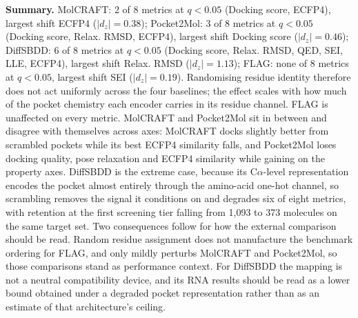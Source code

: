 \noindent\textbf{Summary.} 
MolCRAFT: 2 of 8 metrics at $q<0.05$ (Docking score, ECFP4), largest shift ECFP4 ($|d_z|=0.38$); Pocket2Mol: 3 of 8 metrics at $q<0.05$ (Docking score, Relax. RMSD, ECFP4), largest shift Docking score ($|d_z|=0.46$); DiffSBDD: 6 of 8 metrics at $q<0.05$ (Docking score, Relax. RMSD, QED, SEI, LLE, ECFP4), largest shift Relax. RMSD ($|d_z|=1.13$); FLAG: none of 8 metrics at $q<0.05$, largest shift SEI ($|d_z|=0.19$). 
Randomising residue identity therefore does not act uniformly across the four baselines; the effect scales with how much of the pocket chemistry each encoder carries in its residue channel. FLAG is unaffected on every metric. MolCRAFT and Pocket2Mol sit in between and disagree with themselves across axes: MolCRAFT docks slightly better from scrambled pockets while its best ECFP4 similarity falls, and Pocket2Mol loses docking quality, pose relaxation and ECFP4 similarity while gaining on the property axes. DiffSBDD is the extreme case, because its C$\alpha$-level representation encodes the pocket almost entirely through the amino-acid one-hot channel, so scrambling removes the signal it conditions on and degrades six of eight metrics, with retention at the first screening tier falling from 1,093 to 373 molecules on the same target set. Two consequences follow for how the external comparison should be read. Random residue assignment does not manufacture the benchmark ordering for FLAG, and only mildly perturbs MolCRAFT and Pocket2Mol, so those comparisons stand as performance context. For DiffSBDD the mapping is not a neutral compatibility device, and its RNA results should be read as a lower bound obtained under a degraded pocket representation rather than as an estimate of that architecture's ceiling.
